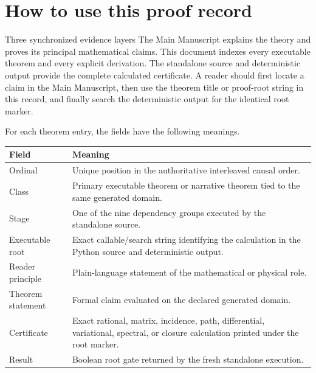 \documentclass[11pt]{article}
\numberwithin{equation}{section}
\theoremstyle{remark}
\begin{document}
\clearpage

\section{How to use this proof record}
\begin{proofguide}{Three synchronized evidence layers}
The Main Manuscript explains the theory and proves its principal mathematical claims. This document indexes every executable theorem and every explicit derivation. The standalone source and deterministic output provide the complete calculated certificate. A reader should first locate a claim in the Main Manuscript, then use the theorem title or proof-root string in this record, and finally search the deterministic output for the identical root marker.
\end{proofguide}

For each theorem entry, the fields have the following meanings.
\begin{longtable}{p{3.4cm}p{10.5cm}}
\toprule Field&Meaning\\\midrule\endhead
Ordinal&Unique position in the authoritative interleaved causal order.\\
Class&Primary executable theorem or narrative theorem tied to the same generated domain.\\
Stage&One of the nine dependency groups executed by the standalone source.\\
Executable root&Exact callable/search string identifying the calculation in the Python source and deterministic output.\\
Reader principle&Plain-language statement of the mathematical or physical role.\\
Theorem statement&Formal claim evaluated on the declared generated domain.\\
Certificate&Exact rational, matrix, incidence, path, differential, variational, spectral, or closure calculation printed under the root marker.\\
Result&Boolean root gate returned by the fresh standalone execution.\\
\bottomrule
\end{longtable}
\end{document}
